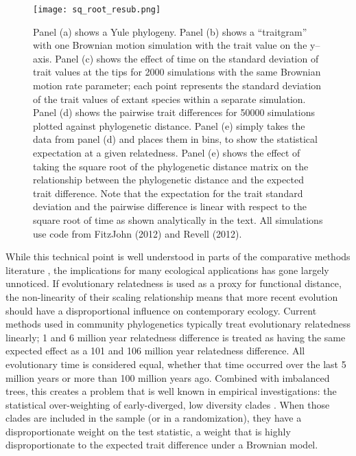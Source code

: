\begin{figure}[H]
\centering
\texttt{[image: sq\_root\_resub.png]}
\caption{Panel (a) shows a Yule phylogeny. Panel (b) shows a ``traitgram'' with one Brownian motion 
simulation with the trait value on the y--axis.  Panel (c) shows the effect of time on the standard deviation of trait values at the tips for 2000 simulations with the same Brownian motion rate parameter; each point represents the standard deviation of the trait values of extant species within a separate simulation.  Panel (d) shows the pairwise trait differences for 50000 simulations plotted against phylogenetic distance.  Panel (e) simply takes the data from panel (d) and places them in bins, to show the statistical expectation at a given relatedness.  Panel (e) shows the effect of taking the square root of the phylogenetic distance matrix on the relationship between the phylogenetic distance and the expected trait difference.  Note that the expectation for the trait standard deviation and the pairwise difference is linear with respect to the square root of time as shown analytically in the text.  All simulations use code from FitzJohn (2012) and Revell (2012).}
\label{sq_root_fig}
\end{figure}

While this technical point is well understood in parts of the comparative methods literature 
\citep{Hardy2012}, the implications for many ecological applications has gone largely unnoticed. 
If evolutionary relatedness is used as a proxy for functional distance, the non-linearity of their 
scaling relationship means that more recent evolution should have a disproportional 
influence on contemporary ecology. Current methods used in community phylogenetics \citep[see 
review of methods 
in][]{vellend2010} typically treat evolutionary relatedness linearly; 1 and 6 million 
year relatedness difference is treated as having the same expected effect as a 
101 and 106 million year relatedness difference. All evolutionary time is 
considered equal, whether that time occurred over the last 5 million years or 
more than 100 million years ago. Combined with imbalanced trees, this creates 
a problem that is well known in empirical investigations: the statistical 
over-weighting of early-diverged, low diversity clades \citep{Kembel2006}. 
When those clades are included in the sample (or in a randomization), they 
have a disproportionate weight on the test statistic, a weight that is highly 
disproportionate to the expected trait difference under a Brownian model.  

